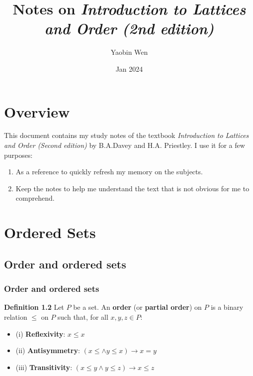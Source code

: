 \documentclass[12pt, letterpaper, oneside]{book}
\title{
  Notes on \textit{Introduction to Lattices and Order (2nd edition)}
}
\author{Yaobin Wen}
\date{Jan 2024}
\begin{document}
\maketitle
\tableofcontents

\chapter*{Overview}

This document contains my study notes of the textbook \textit{Introduction to Lattices and Order (Second edition)} by
B.A.Davey and H.A. Priestley. I use it for a few purposes:

\begin{enumerate}
  \item As a reference to quickly refresh my memory on the subjects.
  \item Keep the notes to help me understand the text that is not obvious for
        me to comprehend.
\end{enumerate}

%
%

\chapter{Ordered Sets}

\section{Order and ordered sets}

\subsection{Order and ordered sets}

\textbf{Definition 1.2} Let $P$ be a set. An \textbf{order} (or \textbf{partial order}) on $P$ is a binary relation
$\leqslant$ on $P$ such that, for all $x, y, z \in P$:
\begin{itemize}
  \item (i) \textbf{Reflexivity}: $x \leqslant x$
  \item (ii) \textbf{Antisymmetry}: $(x \leqslant \land y \leqslant x) \rightarrow x = y$
  \item (iii) \textbf{Transitivity}: $(x \leqslant y \land y \leqslant z) \rightarrow x \leqslant z$
\end{itemize}
\end{document}
